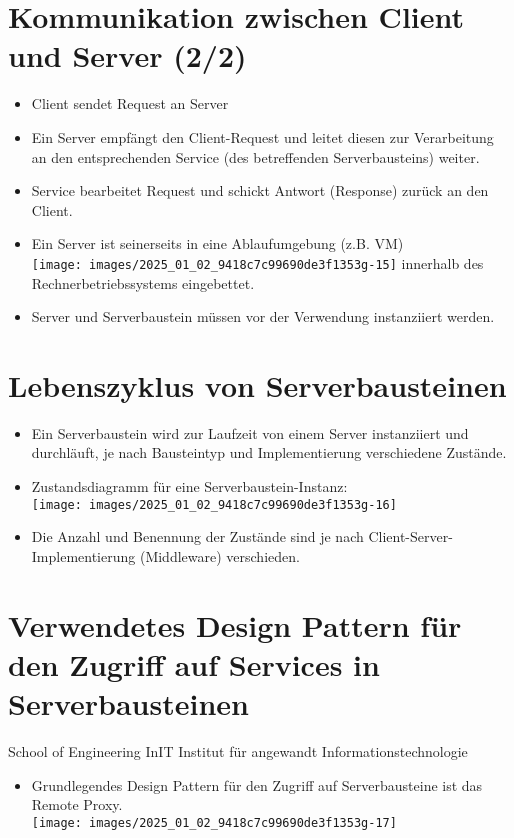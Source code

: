 \documentclass[10pt]{article}
\begin{document}
\section*{Kommunikation zwischen Client und Server (2/2)}
\begin{itemize}
  \item Client sendet Request an Server
  \item Ein Server empfängt den Client-Request und leitet diesen zur Verarbeitung an den entsprechenden Service (des betreffenden Serverbausteins) weiter.
  \item Service bearbeitet Request und schickt Antwort (Response) zurück an den Client.
  \item Ein Server ist seinerseits in eine Ablaufumgebung (z.B. VM)\\
\texttt{[image: images/2025\_01\_02\_9418c7c99690de3f1353g-15]} innerhalb des Rechnerbetriebssystems eingebettet.
  \item Server und Serverbaustein müssen vor der Verwendung instanziiert werden.
\end{itemize}

\section*{Lebenszyklus von Serverbausteinen}
\begin{itemize}
  \item Ein Serverbaustein wird zur Laufzeit von einem Server instanziiert und durchläuft, je nach Bausteintyp und Implementierung verschiedene Zustände.
  \item Zustandsdiagramm für eine Serverbaustein-Instanz:\\
\texttt{[image: images/2025\_01\_02\_9418c7c99690de3f1353g-16]}
  \item Die Anzahl und Benennung der Zustände sind je nach Client-Server-Implementierung (Middleware) verschieden.
\end{itemize}

\section*{Verwendetes Design Pattern für den Zugriff auf Services in Serverbausteinen}
School of Engineering InIT Institut für angewandt Informationstechnologie

\begin{itemize}
  \item Grundlegendes Design Pattern für den Zugriff auf Serverbausteine ist das Remote Proxy.\\
\texttt{[image: images/2025\_01\_02\_9418c7c99690de3f1353g-17]}
\end{itemize}
\end{document}

